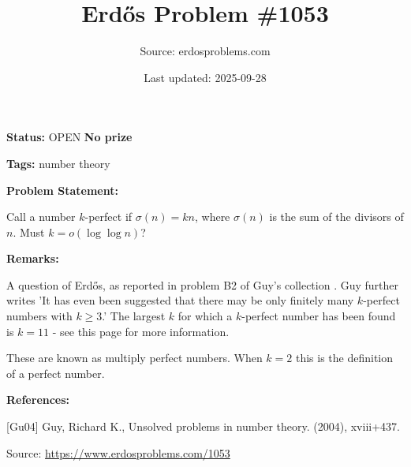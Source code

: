 \documentclass{article}
\title{Erd\H{o}s Problem \#1053}
\date{Last updated: 2025-09-28}
\author{Source: erdosproblems.com}
\begin{document}
\maketitle

\noindent\textbf{Status:} OPEN \quad \textbf{No prize}

\noindent\textbf{Tags:} number theory

\medskip
\noindent\textbf{Problem Statement:}

Call a number $k$-perfect if $\sigma(n)=kn$, where $\sigma(n)$ is the sum of the divisors of $n$. Must $k=o(\log\log n)$?

\bigskip
\noindent\textbf{Remarks:}

A question of Erd\H{o}s, as reported in problem B2 of Guy's collection \cite{Gu04}. Guy further writes 'It has even been suggested that there may be only finitely many $k$-perfect numbers with $k\geq 3$.' The largest $k$ for which a $k$-perfect number has been found is $k=11$ - see this page for more information.

These are known as multiply perfect numbers. When $k=2$ this is the definition of a perfect number.

\bigskip
\noindent\textbf{References:}

[Gu04] Guy, Richard K., Unsolved problems in number theory. (2004), xviii+437.

\bigskip
\noindent\small{Source: \url{https://www.erdosproblems.com/1053}}
\end{document}

